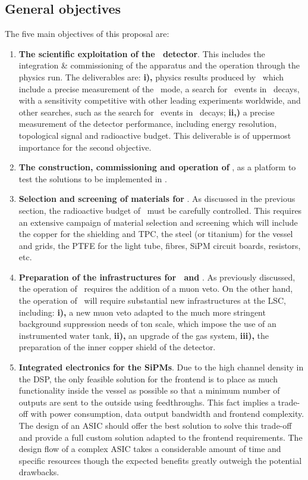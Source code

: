 \subsection*{General objectives}

The five main objectives of this proposal are:
\begin{enumerate}
\item {\bf The scientific exploitation of the \Next\ detector}. This includes the integration \& commissioning of the apparatus and the operation through the physics run. The deliverables are: {\bf i),} physics results produced by \Next\ which include a precise measurement of the \bbtnu\ mode, a search for \bbonu\ events in \XE\ decays, with a sensitivity competitive with other leading experiments worldwide, and other searches, such as the search for \bbonu\ events in \XEX\ decays; {\bf ii,)} a precise measurement of the detector performance, including energy resolution, topological signal and radioactive budget. This deliverable is of uppermost importance for the second objective. 
\item {\bf The construction, commissioning and operation of \HDEMO}, as a platform to test the solutions to be implemented in \NHD.  
\item {\bf Selection and screening of materials for \NHD}. As discussed in the previous section, the radioactive budget of \NHD\ must be carefully controlled. This requires an extensive campaign of material selection and screening which will include the copper for the shielding and TPC, the steel (or titanium) for the vessel and grids, the PTFE for the light tube, fibres, SiPM circuit boards, resistors, etc. 
\item {\bf Preparation of the infrastructures for \Next\ and \NHD}. As previously discussed, the operation of \Next\ requires the addition of a muon veto. On the other hand, the operation of \NHD\ will require substantial new infrastructures at the LSC, including: {\bf i),} a new muon veto adapted to the much more stringent background suppression needs of ton scale, which impose the use of an instrumented water tank, {\bf ii),} an upgrade of the gas system, {\bf iii),} the preparation of the inner copper shield of the detector. 

\item {\bf Integrated electronics for the SiPMs}. Due to the high channel density in the DSP, the only feasible solution for the frontend is to place as much functionality inside the vessel as possible so that a minimum number of outputs are sent to the outside using feedthroughs. This fact implies a trade-off with power consumption, data output bandwidth and frontend complexity. The design of an ASIC should offer the best solution to solve this trade-off and provide a full custom solution adapted to the frontend requirements. The design flow of a complex ASIC takes a considerable amount of time and specific resources though the expected benefits greatly outweigh the potential drawbacks.
\end{enumerate}

